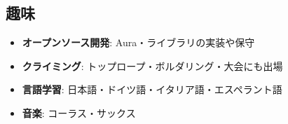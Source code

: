 \documentclass[letterpaper,11pt]{article}
\newcommand{\resumeItem}[2]{
  \item\small{
    \textbf{#1}{: #2 \vspace{-2pt}}
  }
}
\newcommand{\resumeSubItem}[2]{\resumeItem{#1}{#2}\vspace{-4pt}}
\newcommand{\resumeSubHeadingListStart}{\begin{itemize}[leftmargin=*]}
\newcommand{\resumeSubHeadingListEnd}{\end{itemize}}
\begin{document}
\begin{CJK}{UTF8}{ipxma}
\section{趣味}
\resumeSubHeadingListStart
\resumeSubItem{オープンソース開発}{Aura・ライブラリの実装や保守}
\resumeSubItem{クライミング}{トップロープ・ボルダリング・大会にも出場}
\resumeSubItem{言語学習}{日本語・ドイツ語・イタリア語・エスペラント語}
\resumeSubItem{音楽}{コーラス・サックス}
\resumeSubHeadingListEnd

\end{CJK}
\end{document}
